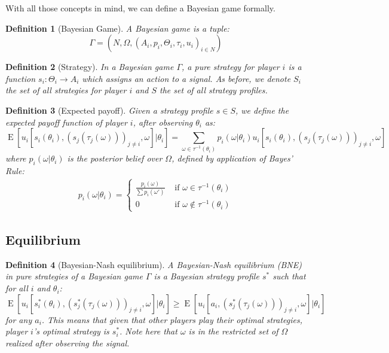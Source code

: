 \documentclass[12pt]{report}
\newtheorem{definition}{Definition}[chapter]
\newcommand{\E}[1]{\operatorname{E}\left[#1\right]}
\begin{document}
With all those concepts in mind, we can define a Bayesian game formally.

\begin{definition}[Bayesian Game]
A Bayesian game is a tuple:  $$\Gamma = (N, \Omega, (A_i, p_i, \Theta_i, \tau_i, u_i)_{i\in N})$$
\end{definition}

\begin{definition}[Strategy]
In a Bayesian game $\Gamma$, a pure strategy for player $i$ is a function $s_i:\Theta_i\to A_i$ which assigns an action to a signal. As before, we denote $S_i$ the set of all strategies for player $i$ and $S$ the set of all strategy profiles.
\end{definition}

\begin{definition}[Expected payoff]
Given a strategy profile $s\in S$, we define the expected payoff function of player $i$, after observing $\theta_i$ as: $$\E{u_i[s_i(\theta_i), (s_{j}(\tau_{j}(\omega)))_{j\neq i}, \omega]\vert\theta_i} = \sum_{\omega\in\tau^{-1}(\theta_i)} p_i(\omega\vert\theta_i) u_i[s_i(\theta_i), (s_{j}(\tau_{j}(\omega)))_{j\neq i}, \omega] $$ where $p_i(\omega	\vert\theta_i)$ is the posterior belief over $\Omega$, defined by application of Bayes' Rule:\begin{align*}
p_i(\omega	\vert\theta_i) = \begin{cases}
\frac{p_i(\omega)}{\sum p_i(\omega')} & \text{ if } \omega \in \tau^{-1}(\theta_i) \\
0 & \text{ if } \omega \not\in \tau^{-1}(\theta_i)
\end{cases}
\end{align*}
\end{definition}

\subsection{Equilibrium}

\begin{definition}[Bayesian-Nash equilibrium]
A Bayesian-Nash equilibrium (BNE) in pure strategies of a Bayesian game $\Gamma$ is a Bayesian strategy profile $s^*$ such that for all $i$ and $\theta_i$: $$ \E{u_i[s_i^*(\theta_i), (s_{j}^*(\tau_{j}(\omega)))_{j\neq i}, \omega]\vert\theta_i} \geq \E{u_i[a_i, (s_{j}^*(\tau_{j}(\omega)))_{j\neq i}, \omega]\vert\theta_i} $$ for any $a_i$. This means that given that other players play their optimal strategies, player $i$'s optimal strategy is $s_i^*$. Note here that $\omega$ is in the restricted set of $\Omega$ realized after observing the signal. 
\end{definition}
\end{document}
